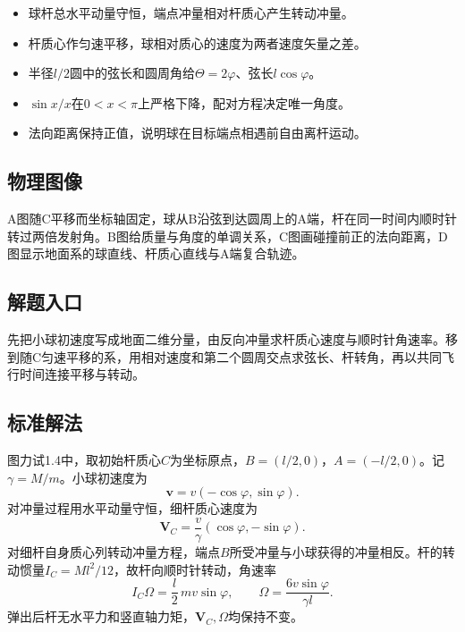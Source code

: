 \documentclass[UTF8,fontset=fandol,a4paper,11pt]{ctexart}
\begin{document}
\begin{itemize}
\item 球杆总水平动量守恒，端点冲量相对杆质心产生转动冲量。
\item 杆质心作匀速平移，球相对质心的速度为两者速度矢量之差。
\item 半径$l/2$圆中的弦长和圆周角给$\Theta=2\varphi$、弦长$l\cos\varphi$。
\item $\sin x/x$在$0<x<\pi$上严格下降，配对方程决定唯一角度。
\item 法向距离保持正值，说明球在目标端点相遇前自由离杆运动。\end{itemize}



\subsection*{物理图像}

A图随C平移而坐标轴固定，球从B沿弦到达圆周上的A端，杆在同一时间内顺时针转过两倍发射角。B图给质量与角度的单调关系，C图画碰撞前正的法向距离，D图显示地面系的球直线、杆质心直线与A端复合轨迹。



\subsection*{解题入口}

先把小球初速度写成地面二维分量，由反向冲量求杆质心速度与顺时针角速率。移到随C匀速平移的系，用相对速度和第二个圆周交点求弦长、杆转角，再以共同飞行时间连接平移与转动。



\subsection*{标准解法}


图力试1.4中，取初始杆质心$C$为坐标原点，$B=(l/2,0)$，$A=(-l/2,0)$。记$\gamma=M/m$。小球初速度为
\[
\boldsymbol v=v(-\cos\varphi,\sin\varphi).
\]
对冲量过程用水平动量守恒，细杆质心速度为
\[
\boldsymbol V_C=\frac{v}{\gamma}(\cos\varphi,-\sin\varphi).
\]
对细杆自身质心列转动冲量方程，端点$B$所受冲量与小球获得的冲量相反。杆的转动惯量$I_C=Ml^2/12$，故杆向顺时针转动，角速率
\[
I_C\Omega=\frac l2\,mv\sin\varphi,\qquad
\boxed{\Omega=\frac{6v\sin\varphi}{\gamma l}}.
\]
弹出后杆无水平力和竖直轴力矩，$\boldsymbol V_C,\Omega$均保持不变。
\end{document}
